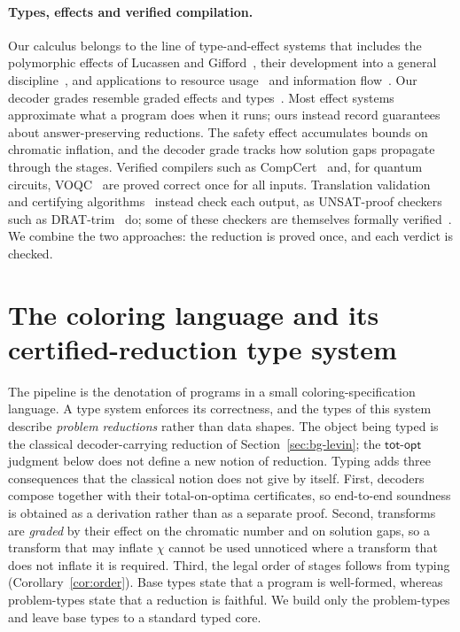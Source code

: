 \documentclass[a4paper,fleqn]{cas-sc}
\newcommand{\totopt}{\mathsf{tot\text{-}opt}}
\begin{document}
\paragraph{Types, effects and verified compilation.} Our calculus belongs to the line
of type-and-effect systems that includes the polymorphic effects of Lucassen and
Gifford~\cite{LucassenGifford1988}, their development into a general
discipline~\cite{TalpinJouvelot1992,NielsonNielson1999}, and applications to resource
usage~\cite{IgarashiKobayashi2002} and information flow~\cite{VolpanoIrvineSmith1996}.
Our decoder grades resemble graded effects and
types~\cite{Katsumata2014,Gaboardi2016,Orchard2019}. Most effect systems approximate
what a program does when it runs; ours instead record guarantees about
answer-preserving reductions. The safety effect accumulates bounds on chromatic
inflation, and the decoder grade tracks how solution gaps propagate through the
stages. Verified compilers such as CompCert~\cite{Leroy2009} and, for quantum
circuits, VOQC~\cite{Hietala2021} are proved correct once for all inputs. Translation
validation~\cite{Pnueli1998} and certifying algorithms~\cite{McConnell2011} instead
check each output, as UNSAT-proof checkers such as DRAT-trim~\cite{Wetzler2014} do;
some of these checkers are themselves formally verified~\cite{Tan2021}. We combine the
two approaches: the reduction is proved once, and each verdict is checked.

\section{The coloring language and its certified-reduction type system}
\label{sec:lang}

The pipeline is the denotation of programs in a small coloring-specification
language. A type system enforces its correctness, and the types of this system
describe \emph{problem reductions} rather than data shapes. The object being typed is
the classical decoder-carrying reduction of Section~\ref{sec:bg-levin}; the $\totopt$
judgment below does not define a new notion of reduction. Typing adds three
consequences that the classical notion does not give by itself. First, decoders
compose together with their total-on-optima certificates, so end-to-end soundness is
obtained as a derivation rather than as a separate proof. Second, transforms are
\emph{graded} by their effect on the chromatic number and on solution gaps, so a
transform that may inflate $\chi$ cannot be used unnoticed where a transform that
does not inflate it is required. Third, the legal order of stages follows from typing
(Corollary~\ref{cor:order}). Base types state that a program is well-formed, whereas
problem-types state that a reduction is faithful. We build only the problem-types and
leave base types to a standard typed core.
\end{document}

